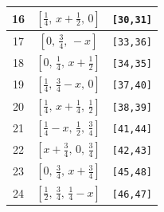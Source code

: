 \documentclass[fleqn,8pt]{jsarticle}
\begin{document}
\begin{longtable}{ccc}
16 & $\left[ \frac{1}{4},\, x + \frac{1}{2},\, 0 \right]$ & {\tt [30,31]} \\ \hline
17 & $\left[ 0,\, \frac{3}{4},\, - x \right]$ & {\tt [33,36]} \\ \hline
18 & $\left[ 0,\, \frac{1}{4},\, x + \frac{1}{2} \right]$ & {\tt [34,35]} \\ \hline
19 & $\left[ \frac{1}{4},\, \frac{3}{4} - x,\, 0 \right]$ & {\tt [37,40]} \\ \hline
20 & $\left[ \frac{1}{4},\, x + \frac{1}{4},\, \frac{1}{2} \right]$ & {\tt [38,39]} \\ \hline
21 & $\left[ \frac{1}{4} - x,\, \frac{1}{2},\, \frac{3}{4} \right]$ & {\tt [41,44]} \\ \hline
22 & $\left[ x + \frac{3}{4},\, 0,\, \frac{3}{4} \right]$ & {\tt [42,43]} \\ \hline
23 & $\left[ 0,\, \frac{3}{4},\, x + \frac{3}{4} \right]$ & {\tt [45,48]} \\ \hline
24 & $\left[ \frac{1}{2},\, \frac{3}{4},\, \frac{1}{4} - x \right]$ & {\tt [46,47]} \\
\end{longtable}
\renewcommand{\arraystretch}{1.2}
\end{document}
